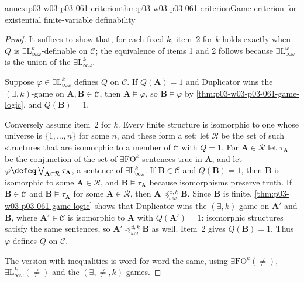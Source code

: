 \begin{annexitem}{annex:p03-w03-p03-061-criterion}{thm:p03-w03-p03-061-criterion}{Game criterion for existential finite-variable definability}
\begin{proof}
It suffices to show that, for each fixed \(k\), item~2 for \(k\) holds
exactly when \(Q\) is \(\exists\mathrm L^k_{\infty\omega}\)-definable on
\(\mathcal C\); the equivalence of items 1 and 2 follows because
\(\exists\mathrm L^\omega_{\infty\omega}\) is the union of the
\(\exists\mathrm L^k_{\infty\omega}\).

Suppose \(\varphi\in\exists\mathrm L^k_{\infty\omega}\) defines \(Q\) on
\(\mathcal C\). If \(Q(\mathbf A)=1\) and Duplicator wins the
\((\exists,k)\)-game on \(\mathbf A,\mathbf B\in\mathcal C\), then
\(\mathbf A\models\varphi\), so \(\mathbf B\models\varphi\) by
\cref{thm:p03-w03-p03-061-game-logic}, and \(Q(\mathbf B)=1\).

Conversely assume item~2 for \(k\). Every finite structure is isomorphic to
one whose universe is \(\{1,\ldots,n\}\) for some \(n\), and these form a set;
let \(\mathcal R\) be the set of such structures that are isomorphic to a
member of \(\mathcal C\) with \(Q=1\). For \(\mathbf A\in\mathcal R\) let
\(\tau_{\mathbf A}\) be the conjunction of the set of
\(\exists\mathrm{FO}^k\)-sentences true in \(\mathbf A\), and let
\(\varphi\defeq\bigvee_{\mathbf A\in\mathcal R}\tau_{\mathbf A}\), a sentence
of \(\exists\mathrm L^k_{\infty\omega}\). If \(\mathbf B\in\mathcal C\) and
\(Q(\mathbf B)=1\), then \(\mathbf B\) is isomorphic to some \(\mathbf
A\in\mathcal R\), and \(\mathbf B\models\tau_{\mathbf A}\) because
isomorphisms preserve truth. If \(\mathbf B\in\mathcal C\) and
\(\mathbf B\models\tau_{\mathbf A}\) for some \(\mathbf A\in\mathcal R\), then
\(\mathbf A\preceq^{\exists,k}_{\omega\omega}\mathbf B\). Since \(\mathbf B\)
is finite, \cref{thm:p03-w03-p03-061-game-logic} shows that Duplicator wins the
\((\exists,k)\)-game on \(\mathbf A'\) and \(\mathbf B\), where
\(\mathbf A'\in\mathcal C\) is isomorphic to \(\mathbf A\) with
\(Q(\mathbf A')=1\): isomorphic structures satisfy the same sentences, so
\(\mathbf A'\preceq^{\exists,k}_{\omega\omega}\mathbf B\) as well. Item~2
gives \(Q(\mathbf B)=1\). Thus \(\varphi\) defines \(Q\) on \(\mathcal C\).

The version with inequalities is word for word the same, using
\(\exists\mathrm{FO}^k(\neq)\), \(\exists\mathrm L^k_{\infty\omega}(\neq)\)
and the \((\exists,\neq,k)\)-games.
\end{proof}
\end{annexitem}

